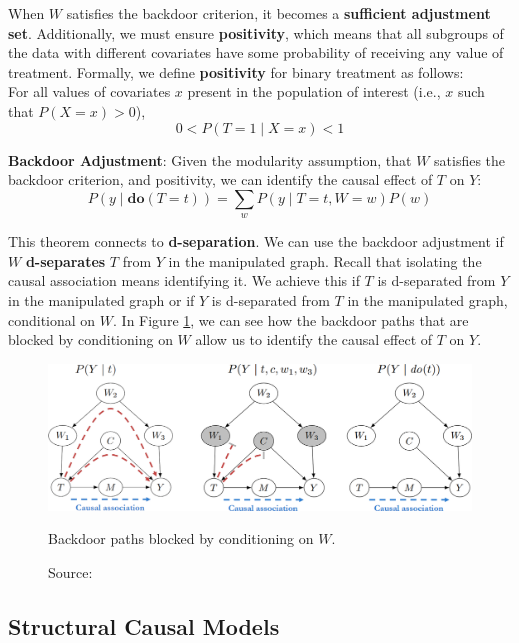 When \( W \) satisfies the backdoor criterion,
it becomes a \textbf{sufficient adjustment set}.
Additionally, we must ensure \textbf{positivity},
which means that all subgroups of the data with different
covariates have some probability of receiving any value of treatment.
Formally, we define \textbf{positivity} for binary treatment as follows:\\
For all values of covariates \( x \) present in the population of
interest (i.e., \( x \) such that \( P(X = x) > 0 \)),
\[
0 < P(T = 1 \mid X = x) < 1
\]

\textbf{Backdoor Adjustment}: Given the modularity assumption,
that \( W \) satisfies the backdoor criterion, and positivity, 
we can identify the causal effect of \( T \) on \( Y \):
\begin{equation}
P(y \mid \textbf{do}(T = t)) = \sum_{w} P(y \mid T = t, W = w) P(w)
\end{equation}

This theorem connects to \textbf{d-separation}.
We can use the backdoor adjustment if \( W \)
\textbf{d-separates} \( T \) from \( Y \) in the manipulated graph.
Recall that isolating the causal association means
identifying it. We achieve this if \( T \) is d-separated from
\( Y \) in the manipulated graph or if \( Y \)
is d-separated from \( T \) in the manipulated graph,
conditional on \( W \).
In Figure \ref{fig:backdoor}, we can see how the backdoor paths
that are blocked by conditioning on \( W \) allow
us to identify the causal effect of \( T \) on \( Y \).

\begin{figure}[H]
    \centering
    \includegraphics[width=\textwidth]{figures/ch3/22.backdoor.png}
    \caption{Backdoor paths blocked by conditioning on \( W \).}
    \vspace{-10px}
    \caption*{\scriptsize{Source: \cite{Neal_2020a}}}
    \label{fig:backdoor}
\end{figure}

\subsection{Structural Causal Models}
\label{sec:scm}

